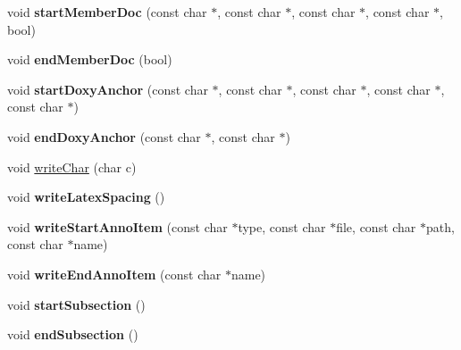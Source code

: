 \begin{DoxyCompactItemize}
\item 
\hypertarget{class_r_t_f_generator_ad767ef57c71199afc7cd587b07bf36c8}{void {\bfseries start\-Member\-Doc} (const char $\ast$, const char $\ast$, const char $\ast$, const char $\ast$, bool)}\label{class_r_t_f_generator_ad767ef57c71199afc7cd587b07bf36c8}

\item 
\hypertarget{class_r_t_f_generator_ab4c60a384c219329e0dfd963e34336eb}{void {\bfseries end\-Member\-Doc} (bool)}\label{class_r_t_f_generator_ab4c60a384c219329e0dfd963e34336eb}

\item 
\hypertarget{class_r_t_f_generator_adbd5f10ab281c6d42fa535ae5834ee60}{void {\bfseries start\-Doxy\-Anchor} (const char $\ast$, const char $\ast$, const char $\ast$, const char $\ast$, const char $\ast$)}\label{class_r_t_f_generator_adbd5f10ab281c6d42fa535ae5834ee60}

\item 
\hypertarget{class_r_t_f_generator_acb8477967f0385b221e6adcc8c9cc67a}{void {\bfseries end\-Doxy\-Anchor} (const char $\ast$, const char $\ast$)}\label{class_r_t_f_generator_acb8477967f0385b221e6adcc8c9cc67a}

\item 
void \hyperlink{class_r_t_f_generator_a0031a638b9159c2d16d2988da4b901ab}{write\-Char} (char c)
\item 
\hypertarget{class_r_t_f_generator_a0024111efcef4c86c58a90626442526b}{void {\bfseries write\-Latex\-Spacing} ()}\label{class_r_t_f_generator_a0024111efcef4c86c58a90626442526b}

\item 
\hypertarget{class_r_t_f_generator_a33695af2d50fc8c46a5ba1eb806e7ab5}{void {\bfseries write\-Start\-Anno\-Item} (const char $\ast$type, const char $\ast$file, const char $\ast$path, const char $\ast$name)}\label{class_r_t_f_generator_a33695af2d50fc8c46a5ba1eb806e7ab5}

\item 
\hypertarget{class_r_t_f_generator_aab3b8288c28235bcf5a4b99a84a8c87a}{void {\bfseries write\-End\-Anno\-Item} (const char $\ast$name)}\label{class_r_t_f_generator_aab3b8288c28235bcf5a4b99a84a8c87a}

\item 
\hypertarget{class_r_t_f_generator_a0e68709c755fc3aef30de8ee8ccb3080}{void {\bfseries start\-Subsection} ()}\label{class_r_t_f_generator_a0e68709c755fc3aef30de8ee8ccb3080}

\item 
\hypertarget{class_r_t_f_generator_a3fb66f3466cdfc1a0a77b8b6282dc0e8}{void {\bfseries end\-Subsection} ()}\label{class_r_t_f_generator_a3fb66f3466cdfc1a0a77b8b6282dc0e8}


\end{DoxyCompactItemize}
